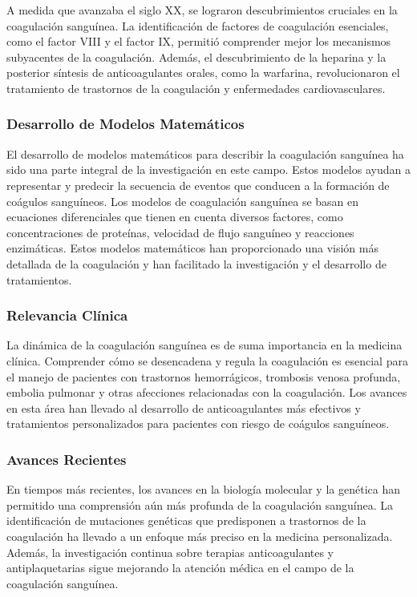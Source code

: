 \documentclass{article}
\begin{document}
A medida que avanzaba el siglo XX, se lograron descubrimientos cruciales en la coagulación sanguínea. La identificación de factores de coagulación esenciales, como el factor VIII y el factor IX, permitió comprender mejor los mecanismos subyacentes de la coagulación. Además, el descubrimiento de la heparina y la posterior síntesis de anticoagulantes orales, como la warfarina, revolucionaron el tratamiento de trastornos de la coagulación y enfermedades cardiovasculares.

\subsubsection{Desarrollo de Modelos Matemáticos}

El desarrollo de modelos matemáticos para describir la coagulación sanguínea ha sido una parte integral de la investigación en este campo. Estos modelos ayudan a representar y predecir la secuencia de eventos que conducen a la formación de coágulos sanguíneos. Los modelos de coagulación sanguínea se basan en ecuaciones diferenciales que tienen en cuenta diversos factores, como concentraciones de proteínas, velocidad de flujo sanguíneo y reacciones enzimáticas. Estos modelos matemáticos han proporcionado una visión más detallada de la coagulación y han facilitado la investigación y el desarrollo de tratamientos.

\subsubsection{Relevancia Clínica}

La dinámica de la coagulación sanguínea es de suma importancia en la medicina clínica. Comprender cómo se desencadena y regula la coagulación es esencial para el manejo de pacientes con trastornos hemorrágicos, trombosis venosa profunda, embolia pulmonar y otras afecciones relacionadas con la coagulación. Los avances en esta área han llevado al desarrollo de anticoagulantes más efectivos y tratamientos personalizados para pacientes con riesgo de coágulos sanguíneos.

\subsubsection{Avances Recientes}

En tiempos más recientes, los avances en la biología molecular y la genética han permitido una comprensión aún más profunda de la coagulación sanguínea. La identificación de mutaciones genéticas que predisponen a trastornos de la coagulación ha llevado a un enfoque más preciso en la medicina personalizada. Además, la investigación continua sobre terapias anticoagulantes y antiplaquetarias sigue mejorando la atención médica en el campo de la coagulación sanguínea.
\end{document}
